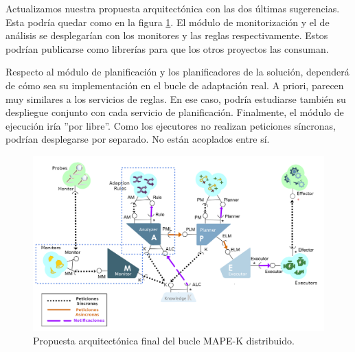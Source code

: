 Actualizamos nuestra propuesta arquitectónica con las dos últimas sugerencias. Esta podría quedar como en la figura \ref{fig:arquitectura-final}. El módulo de monitorización y el de análisis se desplegarían con los monitores y las reglas respectivamente. Estos podrían publicarse como librerías para que los otros proyectos las consuman.

Respecto al módulo de planificación y los planificadores de la solución, dependerá de cómo sea su implementación en el bucle de adaptación real. A priori, parecen muy similares a los servicios de reglas. En ese caso, podría estudiarse también su despliegue conjunto con cada servicio de planificación. Finalmente, el módulo de ejecución iría ''por libre''. Como los ejecutores no realizan peticiones síncronas, podrían desplegarse por separado. No están acoplados entre sí.

\begin{landscape}

  \begin{figure}[h!]
    \centering
    \includegraphics[scale=0.74]{cap_despliegue/images/arquitectura-final}
    \caption{Propuesta arquitectónica final del bucle MAPE-K distribuido.}
    \label{fig:arquitectura-final}
  \end{figure}

\end{landscape}

